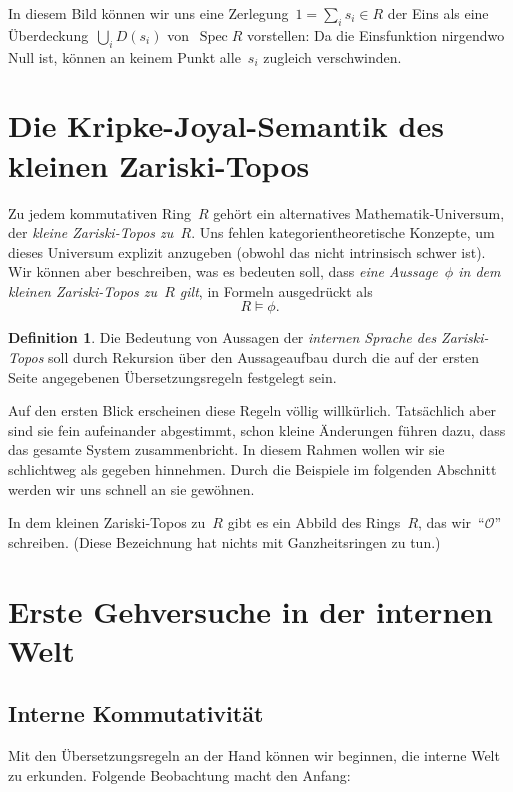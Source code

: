 \documentclass[a4paper,ngerman,12pt]{scrartcl}
\theoremstyle{definition}
\newtheorem{defn}{Definition}[section]
\theoremstyle{plain}
\theoremstyle{remark}
\renewcommand{\O}{\mathcal{O}}
\DeclareMathOperator{\Spec}{Spec}
\renewcommand{\_}{\mathpunct{.}\,}
\newcommand{\?}{\,{:}\,}
\begin{document}
In diesem Bild können wir uns eine Zerlegung~$1 = \sum_i s_i \in R$ der Eins
als eine Über\-dec\-kung~$\bigcup_i D(s_i)$ von~$\Spec R$ vorstellen: Da die
Einsfunktion nirgendwo Null ist, können an keinem Punkt alle~$s_i$ zugleich
verschwinden.


\section{Die Kripke-Joyal-Semantik des kleinen Zariski-Topos}

Zu jedem kommutativen Ring~$R$ gehört ein alternatives Mathematik-Universum,
der \emph{kleine Zariski-Topos zu~$R$}. Uns fehlen kategorientheoretische
Konzepte, um dieses Universum explizit anzugeben (obwohl das nicht intrinsisch
schwer ist). Wir können aber beschreiben, was es bedeuten soll, dass \emph{eine
Aussage~$\phi$ in dem kleinen Zariski-Topos zu~$R$ gilt}, in Formeln
ausgedrückt als
\[ R \models \phi. \]

\begin{defn}Die Bedeutung von Aussagen der \emph{internen Sprache des
Zariski-Topos} soll durch Rekursion über den Aussageaufbau durch die auf der
ersten Seite angegebenen Übersetzungsregeln festgelegt sein.\end{defn}

Auf den ersten Blick erscheinen diese Regeln völlig
willkürlich. Tatsächlich aber sind sie fein aufeinander abgestimmt, schon
kleine Änderungen führen dazu, dass das gesamte System zusammenbricht. In
diesem Rahmen wollen wir sie schlichtweg als gegeben hinnehmen. Durch die
Beispiele im folgenden Abschnitt werden wir uns schnell an sie gewöhnen.

In dem kleinen Zariski-Topos zu~$R$ gibt es ein Abbild des Rings~$R$, das
wir~"`$\O$"' schreiben. (Diese Bezeichnung hat nichts mit Ganzheitsringen zu tun.)


\section{Erste Gehversuche in der internen Welt}

\subsection{Interne Kommutativität}

Mit den Übersetzungsregeln an der Hand können wir beginnen, die interne Welt zu
erkunden. Folgende Beobachtung macht den Anfang:
\end{document}

